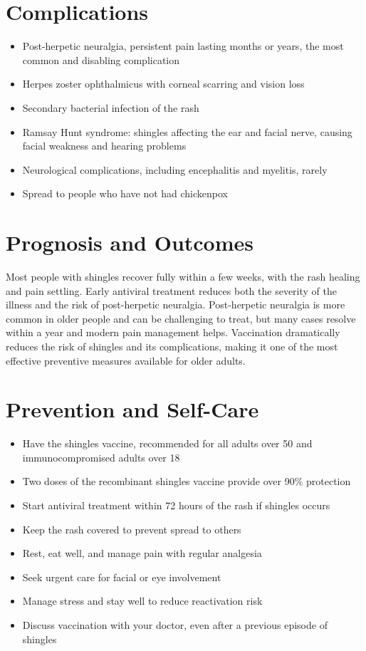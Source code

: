 \section*{Complications}
\begin{itemize}
    \item Post-herpetic neuralgia, persistent pain lasting months or years, the most common and disabling complication
    \item Herpes zoster ophthalmicus with corneal scarring and vision loss
    \item Secondary bacterial infection of the rash
    \item Ramsay Hunt syndrome: shingles affecting the ear and facial nerve, causing facial weakness and hearing problems
    \item Neurological complications, including encephalitis and myelitis, rarely
    \item Spread to people who have not had chickenpox
\end{itemize}

\section*{Prognosis and Outcomes}
Most people with shingles recover fully within a few weeks, with the rash healing and pain settling. Early antiviral treatment reduces both the severity of the illness and the risk of post-herpetic neuralgia. Post-herpetic neuralgia is more common in older people and can be challenging to treat, but many cases resolve within a year and modern pain management helps. Vaccination dramatically reduces the risk of shingles and its complications, making it one of the most effective preventive measures available for older adults.

\section*{Prevention and Self-Care}
\begin{itemize}
    \item Have the shingles vaccine, recommended for all adults over 50 and immunocompromised adults over 18
    \item Two doses of the recombinant shingles vaccine provide over 90\% protection
    \item Start antiviral treatment within 72 hours of the rash if shingles occurs
    \item Keep the rash covered to prevent spread to others
    \item Rest, eat well, and manage pain with regular analgesia
    \item Seek urgent care for facial or eye involvement
    \item Manage stress and stay well to reduce reactivation risk
    \item Discuss vaccination with your doctor, even after a previous episode of shingles
\end{itemize}

